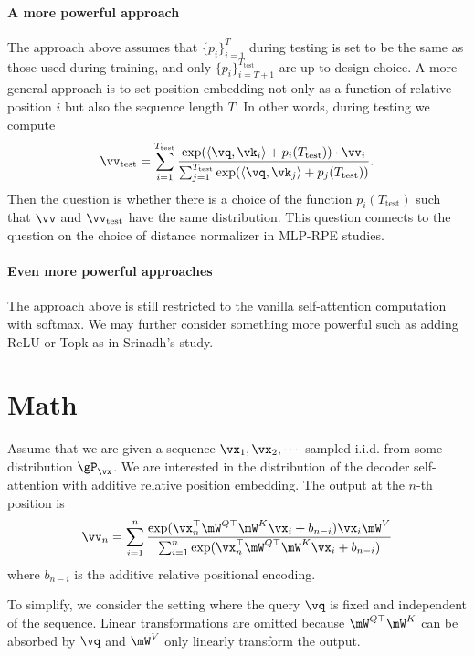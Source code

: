 \paragraph{A more powerful approach} The approach above assumes that $\{p_i\}_{i=1}^{T}$ during testing is set to be the same as those used during training, and only $\{p_i\}_{i=T+1}^{T_\text{test}}$ are up to design choice. A more general approach is to set position embedding not only as a function of relative position $i$ but also the sequence length $T$. In other words, during testing we compute
\begin{equation}
    \vv_\text{test} = \sum_{i = 1}^{T_\text{test}}\frac{\exp(\langle \vq, \vk_i \rangle + p_i(T_\text{test})) \cdot \vv_i}{ \sum_{j=1}^{T_\text{test}} \exp(\langle \vq, \vk_j \rangle + p_j(T_\text{test}))}.
\end{equation}
Then the question is whether there is a choice of the function $p_i(T_\text{test})$ such that $\vv$ and $\vv_\text{test}$ have the same distribution.
This question connects to the question on the choice of distance normalizer in MLP-RPE studies.

\paragraph{Even more powerful approaches}
The approach above is still restricted to the vanilla self-attention computation with softmax. We may further consider something more powerful such as adding ReLU or Topk as in Srinadh's study. 

\section{Math}
Assume that we are given a sequence $\vx_1, \vx_2, \cdots$ sampled i.i.d. from some distribution $\gP_{\vx}$. We are interested in the distribution of the decoder self-attention with additive relative position embedding. The output at the $n$-th position is
\begin{equation}
    \vv_n=\sum_{i = 1}^n\frac{\exp(\vx_n^{\top}\mW^{Q\top}\mW^K\vx_i + b_{n-i}) \vx_i\mW^V}{\sum_{i = 1}^n \exp(\vx_n^{\top}\mW^{Q\top}\mW^K\vx_i + b_{n-i})}
\end{equation}
where $b_{n-i}$ is the additive relative positional encoding.

To simplify, we consider the setting where the query $\vq$ is fixed and independent of the sequence. Linear transformations are omitted because $\mW^{Q\top}\mW^K$ can be absorbed by $\vq$ and $\mW^V$ only linearly transform the output.

